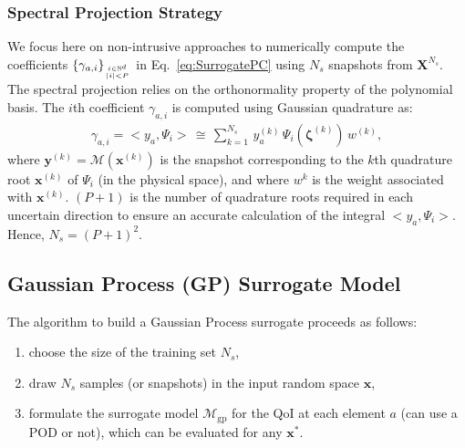 \subsubsection{Spectral Projection Strategy}

We focus here on non-intrusive approaches to numerically compute the coefficients $\lbrace\gamma_{a,i}\rbrace_{i\in\mathbb{N}^d\atop |i|<P}$  in Eq.~\eqref{eq:SurrogatePC} using $N_{s}$ snapshots from $\mathbf{X}^{N_s}$. The spectral projection relies on the orthonormality property of the polynomial basis. The $i$th coefficient $\gamma_{a,i}$ is computed using Gaussian quadrature as:
\begin{align}
\gamma_{a,i} = <y_a,\Psi_i> \,\cong\,\displaystyle\sum_{k = 1}^{N_{s}}\,y_a^{(k)}\,\Psi_i(\boldsymbol{\zeta}^{(k)})\,w^{(k)},
\label{eq:pc_quadrature}
\end{align}
where $\mathbf{y}^{(k)} = \mathcal{M}(\mathbf{x}^{(k)})$ is the snapshot corresponding to the $k$th quadrature root $\mathbf{x}^{(k)}$ of $\Psi_i$ (in the physical space), and where $w^{k}$ is the weight associated with $\mathbf{x}^{(k)}$. $(P+1)$ is the number of quadrature roots required in each uncertain direction to ensure an accurate calculation of the integral $<y_a,\Psi_i>$. Hence, $N_{s} = (P+1)^2$.


\subsection{Gaussian Process (GP) Surrogate Model}\label{sec:GP}

The algorithm to build a Gaussian Process surrogate proceeds as follows:
\begin{enumerate}
\item choose the size of the training set $N_{s}$,
\item draw $N_{s}$ samples (or snapshots) in the input random space $\mathbf{x}$,
\item formulate the surrogate model $\mathcal{M}_{\text{gp}}$ for the QoI at each element $a$ (can use a POD or not), which can be evaluated for any $\mathbf{x}^*$.
\end{enumerate}

